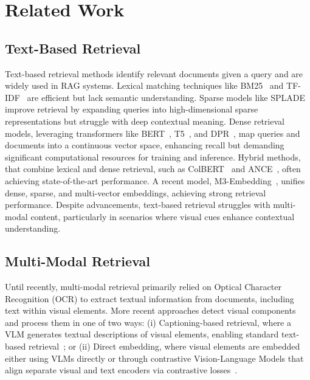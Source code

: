 \section{Related Work}
\label{sec:related_work}





\subsection{Text-Based Retrieval}  

Text-based retrieval methods identify relevant documents given a query and are widely used in RAG systems. Lexical matching techniques like BM25~\cite{robertson1994okapi} and TF-IDF~\cite{sparck1972statistical} are efficient but lack semantic understanding. Sparse models like SPLADE~\cite{formal2021splade} improve retrieval by expanding queries into high-dimensional sparse representations but struggle with deep contextual meaning. Dense retrieval models, leveraging transformers like BERT~\cite{devlin2018bert}, T5~\cite{raffel2020exploring}, and DPR~\cite{karpukhin2020dense}, map queries and documents into a continuous vector space, enhancing recall but demanding significant computational resources for training and inference. Hybrid methods, that combine lexical and dense retrieval, such as ColBERT~\cite{khattab2020colbert} and ANCE~\cite{xiong2020approximate}, often achieving state-of-the-art performance. A recent model, M3-Embedding~\cite{chen2024bge}, unifies dense, sparse, and multi-vector embeddings, achieving strong retrieval performance. Despite advancements, text-based retrieval struggles with multi-modal content, particularly in scenarios where visual cues enhance contextual understanding.


\subsection{Multi-Modal Retrieval}

Until recently, multi-modal retrieval primarily relied on Optical Character Recognition (OCR) to extract textual information from documents, including text within visual elements. More recent approaches detect visual components and process them in one of two ways: (i) Captioning-based retrieval, where a VLM generates textual descriptions of visual elements, enabling standard text-based retrieval~\citep{ramos2023retrieval}; or (ii) Direct embedding, where visual elements are embedded either using VLMs directly or through contrastive Vision-Language Models that align separate visual and text encoders via contrastive losses~\citep{radford2021learning,zhai2023sigmoid}.


